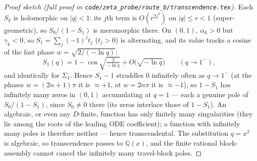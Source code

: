 \documentclass[11pt,a4paper]{article}
\theoremstyle{remark}
\theoremstyle{plain}
\begin{document}
\begin{proof}[Proof sketch (full proof in \texttt{code/zeta\_probe/route\_b/transcendence.tex})]
Each $S_k$ is holomorphic on $|q| < 1$: its $j$th term is $O(r^{2j^2})$ on
$|q| \le r < 1$ (super-geometric), so $S_0/(1-S_1)$ is meromorphic there.
On $(0,1)$, $\alpha_k > 0$ but $\gamma_k < 0$, so $S_1 = \sum_j (-1)^j t_j$
($t_j > 0$) is alternating, and its value tracks a cosine of the fast
phase $w = \sqrt{2/(-\ln q)}$:
\begin{equation}
\label{lem:cos}
S_1(q) = 1 - \cos\!\sqrt{\tfrac{2}{-\ln q}} + O\!\bigl(\sqrt{-\ln q}\bigr)
\qquad (q \to 1^-),
\end{equation}
and identically for $\Sigma_1$.  Hence $S_1 - 1$ straddles $0$ infinitely
often as $q \to 1^-$ (at the phases $w = (2n{+}1)\pi$ it is $\approx +1$,
at $w = 2n\pi$ it is $\approx -1$), so $1 - S_1$ has infinitely many zeros
in $(0,1)$ accumulating at $q = 1$ --- each a genuine pole of
$S_0/(1-S_1)$, since $S_0 \neq 0$ there (its zeros interlace those of
$1-S_1$).  An algebraic, or even any $D$-finite, function has only
finitely many singularities (they lie among the roots of the leading
ODE coefficient); a function with infinitely many poles is therefore
neither --- hence transcendental.  The substitution $q = x^2$ is
algebraic, so transcendence passes to $\mathbb{Q}(x)$, and the finite
rational block-assembly cannot cancel the infinitely many travel-block
poles.
\end{proof}
\end{document}
